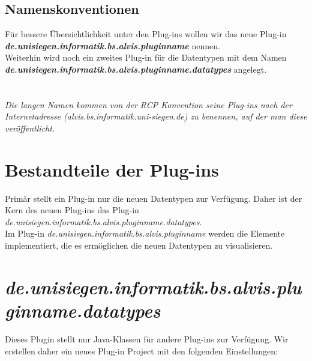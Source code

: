 \documentclass[10pt,a4paper]{article}
\begin{document}
\subsection{Namenskonventionen}
Für bessere Übersichtlichkeit unter den Plug-ins wollen wir das neue Plug-in\\
\textit{\textbf{de.unisiegen.informatik.bs.alvis.pluginname}} nennen. \\
Weiterhin wird noch ein zweites Plug-in für die Datentypen mit dem Namen \\
\textit{\textbf{de.unisiegen.informatik.bs.alvis.pluginname.datatypes}} angelegt.\\
\\ \\
\textit{Die langen Namen kommen von der RCP Konvention seine Plug-ins nach der Internetadresse (alvis.bs.informatik.uni-siegen.de) zu benennen, auf der man diese veröffentlicht.}
\newpage

\section{Bestandteile der Plug-ins}
Primär stellt ein Plug-in nur die neuen Datentypen zur Verfügung. Daher ist der Kern des neuen Plug-ins das Plug-in \textit{de.unisiegen.informatik.bs.alvis.pluginname.datatypes}. \\
Im Plug-in \textit{de.unisiegen.informatik.bs.alvis.pluginname} werden die Elemente implementiert, die es ermöglichen die neuen Datentypen zu visualisieren.
\section{\textit{de.unisiegen.informatik.bs.alvis.pluginname.datatypes}}
Dieses Plugin stellt nur Java-Klassen für andere Plug-ins zur Verfügung. Wir erstellen daher ein neues Plug-in Project mit den folgenden Einstellungen: \\
\end{document}
